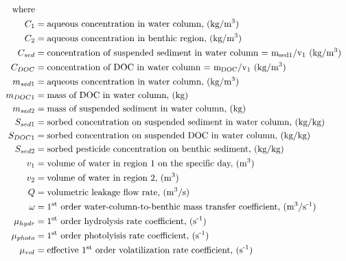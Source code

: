 \documentclass[fleqn, oneside, 11pt]{article}%
\begin{document}
\begin{preview}
\begin{align*}%
\text{where} \nonumber \\
C_{1} & = \text{aqueous concentration in water column, (kg/m\textsuperscript{3})} \nonumber \\
C_{2} & = \text{aqueous concentration in benthic region, (kg/m\textsuperscript{3})} \nonumber \\
C_{sed} & =  \text{concentration of suspended sediment in water column = m\textsubscript{sed1}/v\textsubscript{1} (kg/m\textsuperscript{3})} \nonumber \\
C_{DOC} & =  \text{concentration of DOC in water column = m\textsubscript{DOC}/v\textsubscript{1} (kg/m\textsuperscript{3})} \nonumber \\
m_{sed1} & = \text{aqueous concentration in water column, (kg/m\textsuperscript{3})} \nonumber \\
m_{DOC1} & = \text{mass of DOC in water column, (kg)} \nonumber \\
m_{sed2} & = \text{mass of suspended sediment in water column, (kg)} \nonumber \\
S_{sed1} & = \text{sorbed concentration on suspended sediment in water column, (kg/kg)} \nonumber \\
S_{DOC1} & = \text{sorbed concentration on suspended DOC in water column, (kg/kg)} \nonumber \\
S_{sed2} & = \text{sorbed pesticide concentration on benthic sediment, (kg/kg)} \nonumber \\
v_{1} & = \text{volume of water in region 1 on the specific day, (m\textsuperscript{3})} \nonumber \\
v_{2} & = \text{volume of water in region 2, (m\textsuperscript{3})} \nonumber \\
Q & = \text{volumetric leakage flow rate, (m\textsuperscript{3}/s)} \nonumber \\
\omega & = \text{1\textsuperscript{st} order water-column-to-benthic mass transfer coefficient, (m\textsuperscript{3}/s\textsuperscript{-1})} \nonumber \\
\mu_{hydr} & = \text{1\textsuperscript{st} order hydrolysis rate coefficient, (s\textsuperscript{-1})} \nonumber \\
\mu_{photo} & = \text{1\textsuperscript{st} order photolyisis rate coefficient, (s\textsuperscript{-1})} \nonumber \\
\mu_{vol} & = \text{effective 1\textsuperscript{st} order volatilization rate coefficient, (s\textsuperscript{-1})} \nonumber \\

\end{align*}
\end{preview}
\end{document}
